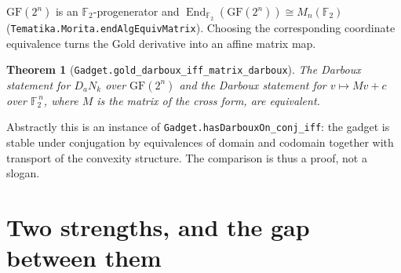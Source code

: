 \documentclass[11pt]{article}
\newcommand{\FF}{\mathbb{F}}
\newcommand{\Ima}{\operatorname{Im}}
\newcommand{\lean}[1]{\texttt{\small #1}}
\theoremstyle{definition}
\theoremstyle{plain}
\newtheorem{thmA}{Theorem}
\begin{document}
$\mathrm{GF}(2^n)$ is an $\FF_2$-progenerator and
$\operatorname{End}_{\FF_2}(\mathrm{GF}(2^n)) \cong M_n(\FF_2)$
(\lean{Tematika.Morita.endAlgEquivMatrix}).  Choosing the corresponding coordinate
equivalence turns the Gold derivative into an affine matrix map.

\begin{center}
\end{center}

\begin{thmA}[\lean{Gadget.gold\_darboux\_iff\_matrix\_darboux}]
The Darboux statement for $D_a N_k$ over $\mathrm{GF}(2^n)$ and the Darboux statement for
$v \mapsto Mv+c$ over $\FF_2^{\,n}$, where $M$ is the matrix of the cross form, are
\emph{equivalent}.
\end{thmA}

Abstractly this is an instance of \lean{Gadget.hasDarbouxOn\_conj\_iff}: the gadget is stable
under conjugation by equivalences of domain and codomain together with transport of the
convexity structure.  The comparison is thus a proof, not a slogan.

\section{Two strengths, and the gap between them}

\begin{center}
\end{center}
\end{document}
